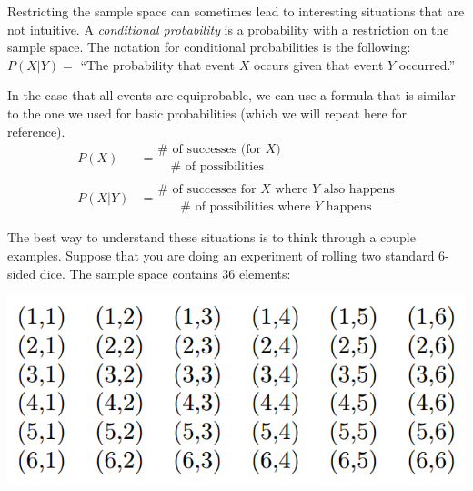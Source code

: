 \documentclass{ximera}
\begin{document}
Restricting the sample space can sometimes lead to interesting situations that are not intuitive. A \emph{conditional probability} is a probability with a restriction on the sample space. The notation for conditional probabilities is the following:
$ P(X | Y) =$ ``The probability that event $X$ occurs given that event $Y$ occurred.''

In the case that all events are equiprobable, we can use a formula that is similar to the one we used for basic probabilities (which we will repeat here for reference).
\begin{align*}
  P(X) & = \dfrac{ \# \text{ of successes (for $X$)}}{ \# \text{ of possibilities } } \\ \\
  P(X | Y) & = \dfrac{ \# \text{ of successes for $X$ where $Y$ also happens}}{ \# \text{ of possibilities where $Y$ happens}}
\end{align*}

The best way to understand these situations is to think through a couple examples. Suppose that you are doing an experiment of rolling two standard 6-sided dice. The sample space contains 36 elements:
\begin{image}
\includegraphics{ConditionalProbTable1.png}
\end{image}
\end{document}
